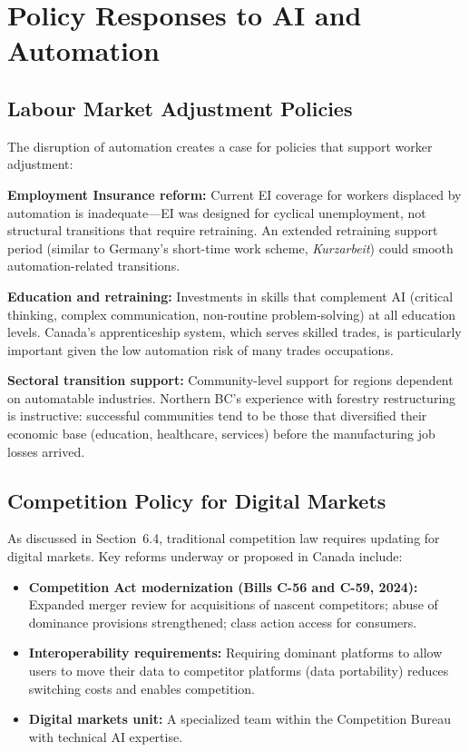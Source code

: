 \section{Policy Responses to AI and Automation}

\subsection{Labour Market Adjustment Policies}

The disruption of automation creates a case for policies that support worker adjustment:

\textbf{Employment Insurance reform:} Current EI coverage for workers displaced by automation is inadequate---EI was designed for cyclical unemployment, not structural transitions that require retraining. An extended retraining support period (similar to Germany's short-time work scheme, \textit{Kurzarbeit}) could smooth automation-related transitions.

\textbf{Education and retraining:} Investments in skills that complement AI (critical thinking, complex communication, non-routine problem-solving) at all education levels. Canada's apprenticeship system, which serves skilled trades, is particularly important given the low automation risk of many trades occupations.

\textbf{Sectoral transition support:} Community-level support for regions dependent on automatable industries. Northern BC's experience with forestry restructuring is instructive: successful communities tend to be those that diversified their economic base (education, healthcare, services) before the manufacturing job losses arrived.

\subsection{Competition Policy for Digital Markets}

As discussed in Section~6.4, traditional competition law requires updating for digital markets. Key reforms underway or proposed in Canada include:

\begin{itemize}
  \item \textbf{Competition Act modernization (Bills C-56 and C-59, 2024):} Expanded merger review for acquisitions of nascent competitors; abuse of dominance provisions strengthened; class action access for consumers.
  \item \textbf{Interoperability requirements:} Requiring dominant platforms to allow users to move their data to competitor platforms (data portability) reduces switching costs and enables competition.
  \item \textbf{Digital markets unit:} A specialized team within the Competition Bureau with technical AI expertise.
\end{itemize}

